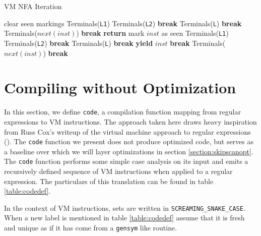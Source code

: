\begin{algorithm}
\caption{VM NFA Iteration} \label{algo:nfaiter}
\begin{algorithmic}
  \State clear seen markings
      \State Terminals({\tt L1})
      \State Terminals({\tt L2})
      \State \textbf{break}
    \EndCase
      \State Terminals({\tt L})
      \State \textbf{break}
    \EndCase
     \EndCase
     \EndCase
      \State Terminals($next(inst)$)
      \State \textbf{break}
    \EndCase
  \EndSwitch
\EndProcedure
{}
    \State \textbf{return}
  \EndIf
  \State mark $inst$ as seen
      \State Terminals({\tt L1})
      \State Terminals({\tt L2})
      \State \textbf{break}
    \EndCase
      \State Terminals({\tt L})
      \State \textbf{break}
    \EndCase
     \EndCase
      \State \textbf{yield} $inst$
      \State \textbf{break}
    \EndCase
      \State Terminals($next(inst)$)
      \State \textbf{break}
    \EndCase
  \EndSwitch
\EndProcedure
\end{algorithmic}
\end{algorithm}

\section{Compiling without Optimization}
\label{section:compilation}

In this section, we define \verb'code', a compilation function mapping
from regular expressions to VM instructions. The approach taken here
draws heavy inspiration from Russ Cox's writeup of the virtual machine
approach to regular expressions (\cite{CoxVirtualMachineApproach}).
The \verb'code' function we present does not produce optimized code,
but serves as a baseline over which we will layer optimizations
in section \ref{section:skipscanopt}.
The \verb'code' function performs some simple case analysis on its
input and emits a recursively defined sequence of VM instructions when applied
to a regular expression.
The particulars of this translation can
be found in table \ref{table:codedef}.

In the context of VM instructions, sets are written in
\texttt{SCREAMING\allowbreak\_SNAKE\allowbreak\_CASE}.
When a new label is mentioned in table
\ref{table:codedef} assume that it is fresh and unique as if it has
come from a \verb'gensym' like routine.

